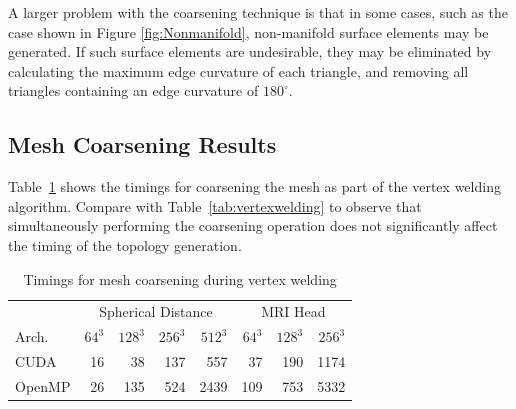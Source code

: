\documentclass[journal]{vgtc}                %
\begin{document}
A larger problem with the coarsening technique is that in some cases, such as the case shown in Figure \ref{fig:Nonmanifold}, non-manifold surface elements may be generated. If such surface elements are undesirable, they may be eliminated by calculating the maximum edge curvature of each triangle, and removing all triangles containing an edge curvature of $180^{\circ}$.

\subsection{Mesh Coarsening Results}

Table~\ref{tab:timingscoarsening} shows the timings for coarsening the mesh as part of the vertex welding algorithm. Compare with Table~\ref{tab:vertexwelding} to observe that simultaneously performing the coarsening operation does not significantly affect the timing of the topology generation.


\begin{table}[h!]
\begin{center}
\begin{tabular}{l|r r r r|r r r}
 & \multicolumn{4}{|c|}{Spherical Distance} & \multicolumn{3}{|c}{MRI Head}\\
Arch. & $64^3$ & $128^3$ & $256^3$ & $512^3$ & $64^3$ & $128^3$ & $256^3$\\
\hline
CUDA & 16 & 38 & 137 & 557 & 37 & 190 & 1174 \\
OpenMP & 26 & 135 & 524 & 2439 & 109 & 753 & 5332 \\
\end{tabular}
\end{center}
\caption{Timings for mesh coarsening during vertex welding}
\label{tab:timingscoarsening}
\end{table}
\end{document}
